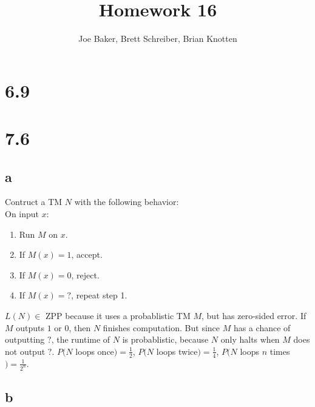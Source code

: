 \documentclass[letterpaper,notitlepage,twoside]{article}
\begin{document}
\title{Homework 16}
\author{Joe Baker, Brett Schreiber, Brian Knotten}
\maketitle

\section*{6.9}

\section*{7.6}
\subsection*{a}
Contruct a TM $N$ with the following behavior: \\
On input $x$:
\begin{enumerate}
  \item Run $M$ on $x$.
  \item If $M(x) = 1$, accept.
  \item If $M(x) = 0$, reject.
  \item If $M(x) = ?$, repeat step 1.
\end{enumerate}
$L(N) \in$ ZPP because it uses a probablistic TM $M$, but has zero-sided error. If $M$ outputs $1$ or $0$, then $N$ finishes computation. But since $M$ has a chance of outputting $?$, the runtime of $N$ is probablistic, because $N$ only halts when $M$ does not output $?$. $P(N$ loops once$) = \frac{1}{2}$, $P(N$ loops twice$) = \frac{1}{4}$, $P(N$ loops $n$ times$) = \frac{1}{2^n}$.
\subsection*{b}
\end{document}
